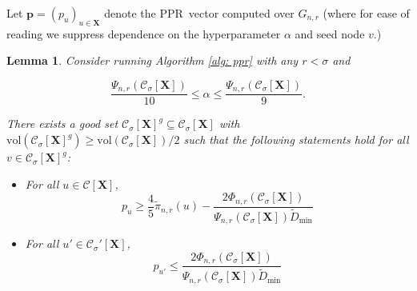 \documentclass{article}
\newcommand{\vol}{\mathrm{vol}}
\newcommand{\1}{\mathbf{1}}
\newcommand{\pbf}{\mathbf{p}}
\newcommand{\Xbf}{\mathbf{X}}
\newcommand{\Cset}{\mathcal{C}}
\newcommand{\Csig}{\Cset_{\sigma}}
\newcommand{\pprspace}{{\sc PPR~}}
\theoremstyle{aldenthm}
\newtheorem{lemma}{Lemma}
\begin{document}
	
Let $\pbf = (p_u)_{u \in \Xbf}$ denote the \pprspace vector computed over $G_{n,r}$ (where for ease of reading we suppress dependence on the hyperparameter $\alpha$ and seed node $v$.) 
	
\begin{lemma} 
	\label{lem: setup}
	Consider running Algorithm \ref{alg: ppr} with any $r < \sigma$ and
	
	\begin{equation} 
	\label{eqn: upper_bound_alpha}
	\frac{\Psi_{n,r}(\Csig[\Xbf])}{10} \leq \alpha \leq \frac{\Psi_{n,r}(\Csig[\Xbf])}{9}.
	\end{equation}
	
	There exists a good set $\Csig[\Xbf]^g \subseteq \Csig[\Xbf]$ with $\vol(\Csig[\Xbf]^g) \geq \vol(\Csig[\Xbf])/2$ such that the following statements hold for all $v \in \Csig[\Xbf]^g$:
	\begin{itemize}
		\item For all $u \in \Cset[\Xbf]$,
		\begin{equation*}
		p_u \geq \frac{4}{5} \widetilde{\pi}_{n,r}(u) - \frac{2 \Phi_{n,r}(\Csig[\Xbf])}{\Psi_{n,r}(\Csig[\Xbf]) \widetilde{D}_{\min}}
		\end{equation*}
		\item For all $u' \in \Csig'[\Xbf]$,
		\begin{equation*}
		p_{u'} \leq \frac{2 \Phi_{n,r}(\Csig[\Xbf])}{\Psi_{n,r}(\Csig[\Xbf]) \widetilde{D}_{\min}}
		\end{equation*}
	\end{itemize}
\end{lemma}
\end{document}
